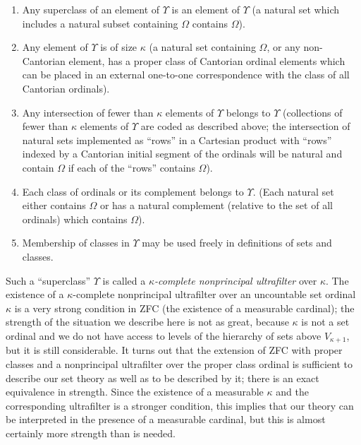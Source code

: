 \begin{enumerate}
 \item Any superclass of an element of $\Upsilon$ is an element of
   $\Upsilon$ (a natural set which includes a natural subset containing
   $\Omega$ contains $\Omega$).

 \item Any element of $\Upsilon$ is of size $\kappa$ (a natural set
   containing $\Omega$, or any non-Cantorian element, has a proper class
   of Cantorian ordinal elements which can be placed
   in an external one-to-one correspondence with the class of all Cantorian
   ordinals). 

 \item Any intersection of fewer than $\kappa$
   elements of $\Upsilon$ 
   belongs to $\Upsilon$ (collections of fewer than $\kappa$ elements of
   $\Upsilon$ are coded as described above; the intersection of natural
   sets implemented as ``rows'' in a Cartesian product
   with ``rows'' 
   indexed by a Cantorian initial segment of the ordinals will
   be natural and contain $\Omega$ if each of the ``rows'' contains $\Omega$).

 \item Each class of ordinals or its
   complement belongs to $\Upsilon$. 
   (Each natural set either contains $\Omega$ or has a natural
   complement 
   (relative to the set of all ordinals) which contains $\Omega$).

 \item  Membership of classes in $\Upsilon$ may be used
   freely in definitions of sets and classes. 
\end{enumerate}

Such a ``superclass'' $\Upsilon$ is called a {\itshape $\kappa$-complete
nonprincipal ultrafilter\/} over $\kappa$.  The existence of
a $\kappa$-complete nonprincipal ultrafilter over an
uncountable set ordinal $\kappa$ is a very strong condition
in ZFC (the 
existence of a measurable cardinal); the strength of
the situation we 
describe here is not as great, because $\kappa$ is not a set ordinal
and we do not have access to levels of the hierarchy of sets above
$V_{\kappa+1}$, but it is still considerable.  It turns out that the
extension of ZFC with proper classes and a
nonprincipal 
ultrafilter over the proper class ordinal is sufficient to describe
our set theory as well as to be described by it; there is an exact
equivalence in strength.  Since the existence of a measurable $\kappa$
and the corresponding ultrafilter is a stronger condition, this
implies that our theory can be interpreted in the presence of a
measurable cardinal, but this is almost certainly more
strength than is needed.

